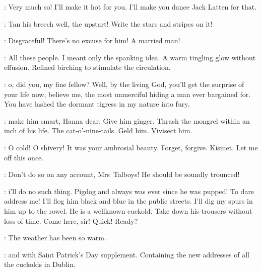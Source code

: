 \Talboys:
Very much so!
I'll make it hot for you.
I'll make you dance Jack Latten for that.

\Bellingham:
Tan his breech well, the upstart!
Write the stars and stripes on it!

\Yelverton:
Disgraceful!
There's no excuse for him!
A married man!

\Bloom:
All these people.
I meant only the spanking idea.
A warm tingling glow without effusion.
Refined birching to stimulate the circulation.

\Talboys:
o, did you, my fine fellow?
Well, by the living God, you'll get the surprise of your life now,
believe me, the most unmerciful hiding a man ever bargained for.
You have lashed the dormant tigress in my nature into fury.

\Bellingham:
make him smart, Hanna dear.
Give him ginger.
Thrash the mongrel within an inch of his life.
The cat-o'-nine-tails.
Geld him.
Vivisect him.

\Bloom:
O cold! O shivery!
It was your ambrosial beauty.
Forget, forgive. Kismet.
Let me off this once.

\Yelverton:
Don't do so on any account, Mrs~Talboys!
He should be soundly trounced!

\Talboys:
i'll do no such thing.
Pigdog and always was ever since he was pupped!
To dare address me!
I'll flog him black and blue in the public streets.
I'll dig my spurs in him up to the rowel.
He is a wellknown cuckold.
Take down his trousers without loss of time.
Come here, sir! Quick! Ready?

\Bloom:
The weather has been so warm.


\DavyStephens:
and  with Saint Patrick's Day supplement.
Containing the new addresses of all the cuckolds in Dublin.


